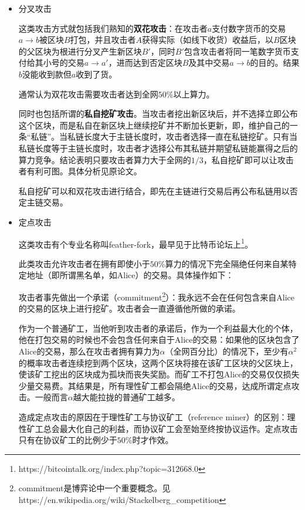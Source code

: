 \begin{itemize}
	\item 分叉攻击
	
	这类攻击方式就包括我们熟知的\textbf{双花攻击}：在攻击者$a$支付数字货币的交易$a\rightarrow b$被区块$B$打包，并且攻击者$A$获得实际（如线下收货）收益后，以$B$区块的父区块为根进行分叉产生新区块$B'$，同时$B'$包含攻击者将同一笔数字货币支付给其小号的交易$a\rightarrow a'$，进而达到否定区块$B$及其中交易$a\rightarrow b$的目的。结果$b$没能收到款但$a$收到了货。
	
	通常认为双花攻击需要攻击者达到全网$50\%$以上算力。
	
	同时也包括所谓的\textbf{私自挖矿攻击}。当攻击者挖出新区块后，并不选择立即公布这个区块，而是私自在新区块上继续挖矿并不断加长更新，即，维护自己的一条“私链”。当私链长度大于主链长度时，攻击者选择一直在私链挖矿。只有当私链长度等于主链长度时，攻击者才选择公布其私链并期望私链能赢得之后的算力竞争。结论表明只要攻击者算力大于全网的$1/3$，私自挖矿即可以让攻击者有利可图。具体分析见原论文\cite{eyal2018majority}。
	
	私自挖矿可以和双花攻击进行结合，即先在主链进行交易后再公布私链用以否定主链交易。
	
	\item 定点攻击
	
	这类攻击有个专业名称叫feather-fork，最早见于比特币论坛上\footnote{https://bitcointalk.org/index.php?topic=312668.0}。
	
	此类攻击允许攻击者在拥有即使小于$50\%$算力的情况下完全隔绝任何来自某特定地址（即所谓黑名单，如Alice）的交易。具体操作如下：
	
	攻击者事先做出一个承诺（commitment\footnote{commitment是博弈论中一个重要概念。见https://en.wikipedia.org/wiki/Stackelberg\_competition}）：我永远不会在任何包含来自Alice的交易的区块上进行挖矿。攻击者会一直遵循他所做的承诺。
	
	作为一个普通矿工，当他听到攻击者的承诺后，作为一个利益最大化的个体，他在打包交易的时候也不会包含任何来自于Alice的交易：如果他的区块包含了Alice的交易，那么在攻击者拥有算力为$\alpha$（全网百分比）的情况下，至少有$\alpha^2$的概率攻击者连续挖到两个区块，这两个区块将接在该矿工区块的父区块上，使该矿工挖出的区块成为孤块而丧失奖励。而矿工不打包Alice的交易仅仅损失少量交易费。其结果是，所有理性矿工都会隔绝Alice的交易，达成所谓定点攻击。一般而言$\alpha$越大能拉拢的普通矿工越多。
	
	造成定点攻击的原因在于理性矿工与协议矿工（reference miner）的区别：理性矿工总会最大化自己的利益，而协议矿工会至始至终按协议运作。定点攻击只有在协议矿工的比例少于$50\%$时才作效。
	

\end{itemize}
